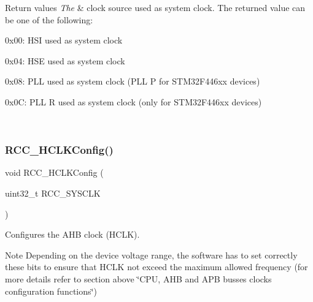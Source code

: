 \begin{DoxyRetVals}{Return values}
{\em The} & clock source used as system clock. The returned value can be one of the following\+:
\begin{DoxyItemize}
\item 0x00\+: H\+SI used as system clock
\item 0x04\+: H\+SE used as system clock
\item 0x08\+: P\+LL used as system clock (P\+LL P for S\+T\+M32\+F446xx devices)
\item 0x0C\+: P\+LL R used as system clock (only for S\+T\+M32\+F446xx devices) 
\end{DoxyItemize}\\
\hline
\end{DoxyRetVals}
\mbox{\label{group___r_c_c___group2_ga9d0aec72e236c6cdf3a3a82dfb525491}} 
\subsubsection{\texorpdfstring{R\+C\+C\+\_\+\+H\+C\+L\+K\+Config()}{RCC\_HCLKConfig()}}
{\footnotesize\ttfamily void R\+C\+C\+\_\+\+H\+C\+L\+K\+Config (\begin{DoxyParamCaption}\item[{uint32\+\_\+t}]{R\+C\+C\+\_\+\+S\+Y\+S\+C\+LK }\end{DoxyParamCaption})}



Configures the A\+HB clock (H\+C\+LK). 

\begin{DoxyNote}{Note}
Depending on the device voltage range, the software has to set correctly these bits to ensure that H\+C\+LK not exceed the maximum allowed frequency (for more details refer to section above \char`\"{}\+C\+P\+U, A\+H\+B and A\+P\+B busses clocks configuration functions\char`\"{}) 
\end{DoxyNote}

